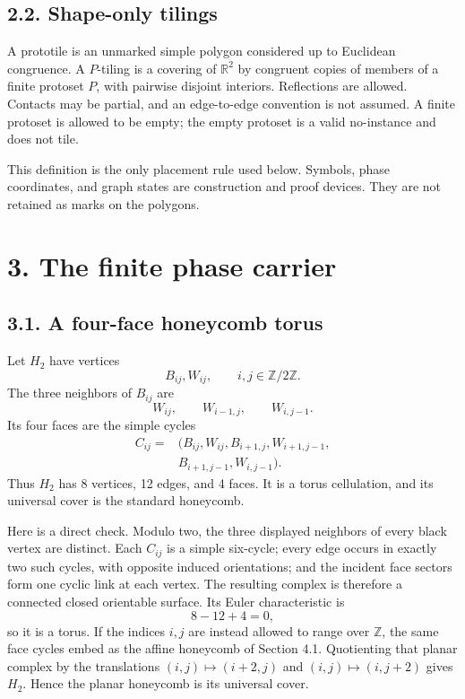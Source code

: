 \documentclass[11pt]{article}
\begin{document}
\subsection*{2.2. Shape-only tilings}

A prototile is an unmarked simple polygon considered up to Euclidean
congruence. A \(P\)-tiling is a covering of \(\mathbb R^2\) by congruent
copies of members of a finite protoset \(P\), with pairwise disjoint
interiors. Reflections are allowed. Contacts may be partial, and an
edge-to-edge convention is not assumed. A finite protoset is allowed to be
empty; the empty protoset is a valid no-instance and does not tile.

This definition is the only placement rule used below. Symbols, phase
coordinates, and graph states are construction and proof devices. They are
not retained as marks on the polygons.

\section*{3. The finite phase carrier}

\subsection*{3.1. A four-face honeycomb torus}

Let \(H_2\) have vertices
\[
  B_{ij},W_{ij},\qquad i,j\in\mathbb Z/2\mathbb Z.
\]
The three neighbors of \(B_{ij}\) are
\[
  W_{ij},\qquad W_{i-1,j},\qquad W_{i,j-1}.
\]
Its four faces are the simple cycles
\[
\begin{split}
C_{ij}={}&(B_{ij},W_{ij},B_{i+1,j},W_{i+1,j-1},\\
          &B_{i+1,j-1},W_{i,j-1}).
\end{split}
\]
Thus \(H_2\) has 8 vertices, 12 edges, and 4 faces. It is a torus
cellulation, and its universal cover is the standard honeycomb.

Here is a direct check. Modulo two, the three displayed neighbors of every
black vertex are distinct. Each \(C_{ij}\) is a simple six-cycle; every edge
occurs in exactly two such cycles, with opposite induced orientations; and
the incident face sectors form one cyclic link at each vertex. The resulting
complex is therefore a connected closed orientable surface. Its Euler
characteristic is
\[
  8-12+4=0,
\]
so it is a torus. If the indices \(i,j\) are instead allowed to range over
\(\mathbb Z\), the same face cycles embed as the affine honeycomb of Section
4.1. Quotienting that planar complex by the translations
\((i,j)\mapsto(i+2,j)\) and \((i,j)\mapsto(i,j+2)\) gives \(H_2\). Hence the
planar honeycomb is its universal cover.
\end{document}
